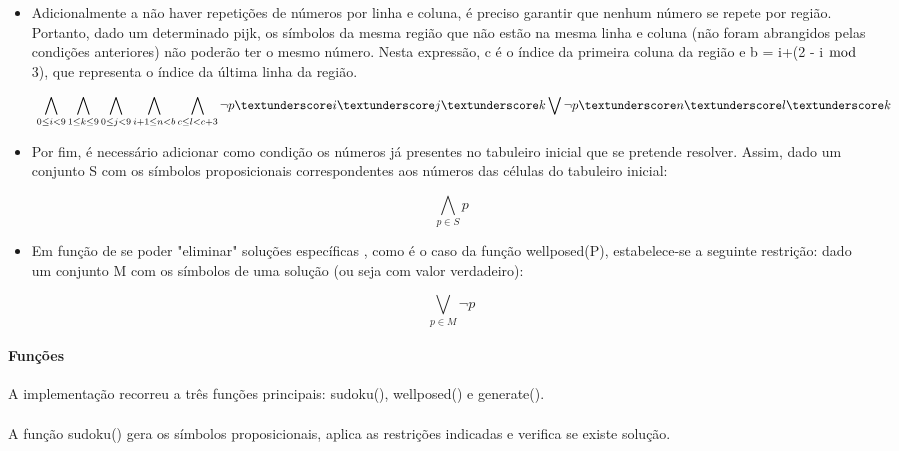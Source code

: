 \documentclass[a4paper,12pt]{article}
\begin{document}
\begin{itemize}
	
	\item Adicionalmente a não haver repetições de números por linha e coluna, é preciso garantir que nenhum número se repete por região. Portanto, dado um determinado p\textunderscore i\textunderscore j\textunderscore k, os símbolos da mesma região que não estão na mesma linha e coluna (não foram abrangidos pelas condições anteriores) não poderão ter o mesmo número. Nesta expressão, c é o índice da primeira coluna da região e b = i+(2 - i $\bmod$ 3), que representa o índice da última linha da região.
	
	\begin{displaymath}
	\
	\bigwedge_{0\leq i < 9} \bigwedge_{1\leq k \leq 9} \bigwedge_{0\leq j < 9} \bigwedge_{i + 1 \leq n < b} \bigwedge_{c\leq l < c+3} \lnot p \textunderscore i\textunderscore j\textunderscore k \bigvee \lnot p \textunderscore n \textunderscore l \textunderscore k
	\end{displaymath}
	
	\item Por fim, é necessário adicionar como condição os números já presentes no tabuleiro inicial que se pretende resolver. Assim, dado um conjunto S com os símbolos proposicionais correspondentes aos números das células do tabuleiro inicial: 
	
	\begin{displaymath}
	\
	\bigwedge_{p\in S} p
	\end{displaymath}
	
	\item Em função de se poder "eliminar" soluções específicas , como é o caso da função well\textunderscore posed(P), estabelece-se a seguinte restrição: dado um conjunto M com os símbolos de uma solução (ou seja com valor verdadeiro):
	
	\begin{displaymath}
	\
	\bigvee_{p\in M} \lnot p
	\end{displaymath}
	
\end{itemize}
\paragraph{Funções \newline}
A implementação recorreu a três funções principais: sudoku(), well\textunderscore posed() e generate().

\paragraph{}
A função sudoku() gera os símbolos proposicionais, aplica as restrições indicadas e verifica se existe solução.
\end{document}
